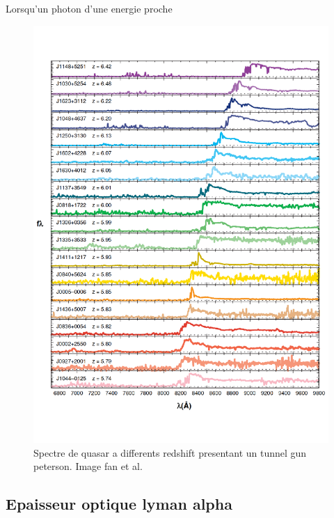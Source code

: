 Lorsqu'un photon d'une energie proche 

\begin{figure}[bth]
        \includegraphics[width=.95\linewidth]{img/01/quasar_spectre.pdf} 
        \caption{Spectre de quasar a differents redshift presentant un tunnel gun peterson.
        Image fan et al.}
 		\label{fig:spectre_quasar}
\end{figure}

\subsection{Epaisseur optique lyman alpha}

